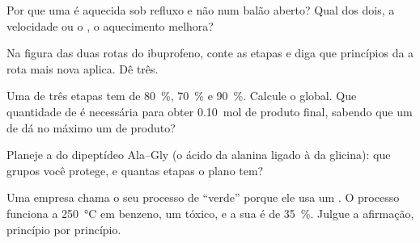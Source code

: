 \begin{exercise}[$\star\star$]\label{exo:g12:synthesis-strategy:10}
Por que uma  é aquecida sob refluxo e não num balão aberto? Qual
dos dois, a velocidade ou o , o aquecimento melhora?
\end{exercise}

\begin{exercise}[$\star\star$]\label{exo:g12:synthesis-strategy:11}
Na figura das duas rotas do ibuprofeno, conte as etapas e diga que
princípios da  a rota mais nova aplica. Dê três.
\end{exercise}

\begin{exercise}[$\star\star\star$]\label{exo:g12:synthesis-strategy:12}
Uma  de três etapas tem  de \qty{80}{\percent},
\qty{70}{\percent} e \qty{90}{\percent}. Calcule o  global.
Que quantidade de  é necessária para obter \qty{0.10}{mol}
de produto final, sabendo que um  de  dá no máximo um
 de produto?
\end{exercise}

\begin{exercise}[$\star\star\star$]\label{exo:g12:synthesis-strategy:13}
Planeje a  do dipeptídeo Ala--Gly (o ácido da alanina ligado à
 da glicina): que grupos você protege, e quantas etapas o plano
tem?
\end{exercise}

\begin{exercise}[$\star\star\star$]\label{exo:g12:synthesis-strategy:14}
Uma empresa chama o seu processo de ``verde'' porque ele usa um
. O processo funciona a \qty{250}{\celsius} em benzeno, um
 tóxico, e a sua  é de \qty{35}{\percent}.
Julgue a afirmação, princípio por princípio.
\end{exercise}

